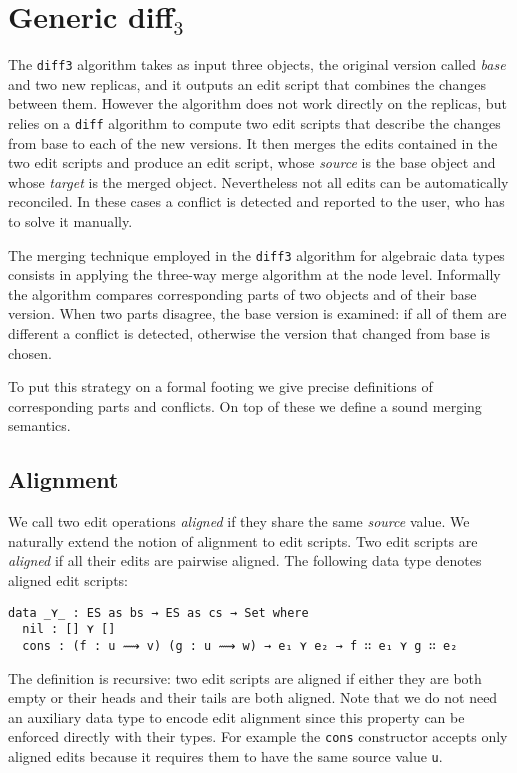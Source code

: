 \documentclass[preprint]{sigplanconf}
\theoremstyle{plain}
\begin{document}
\section{Generic diff$_3$}
	The \texttt{diff3} algorithm takes as input three objects, the original
	version called \emph{base} and two new replicas, and it outputs an
	edit script that combines the changes between them.
	However the algorithm does not work directly on the replicas, but relies
	on a \texttt{diff} algorithm to compute two edit scripts that describe
	the changes from base to each of the new versions.
	It then merges the edits contained in the two edit scripts and produce
	an edit script, whose \emph{source} is the base object and whose 
	\emph{target} is the merged object.
	Nevertheless not all edits can be automatically reconciled.
	In these cases a conflict is detected and reported to the user, who has
	to solve it manually.
		
	The merging technique employed in the \texttt{diff3} algorithm for
	algebraic data types consists in applying the three-way merge algorithm
	at the node level. 
	Informally the algorithm compares corresponding parts 
	of two objects and of their base version.
	When two parts disagree, the base version is examined:
	if all of them are different a conflict is detected, 
        otherwise the version that changed from base is chosen.
	
	To put this strategy on a formal footing we give precise definitions
	of corresponding parts and conflicts.
	On top of these we define a sound merging semantics.

	\subsection{Alignment}
        \label{subsec:alignment}
	We call two edit operations \emph{aligned} if they share the
        same \emph{source} value.
        We naturally extend the notion of alignment to edit
        scripts.
        Two edit scripts are \emph{aligned} if all their edits are
        pairwise aligned. The following data type denotes aligned edit
        scripts:
\begin{verbatim}
data _⋎_ : ES as bs → ES as cs → Set where
  nil : [] ⋎ []
  cons : (f : u ⟿ v) (g : u ⟿ w) → e₁ ⋎ e₂ → f ∷ e₁ ⋎ g ∷ e₂ 
\end{verbatim}
	The definition is recursive: two edit scripts are aligned if
        either they are both empty or their heads and their tails are
        both aligned.
	Note that we do not need an auxiliary data type to encode edit
        alignment since this property can be enforced directly with
        their types.
	For example the \texttt{cons} constructor accepts only aligned
        edits because it requires them to have the same source value
        \texttt{u}.
	
\end{document}
